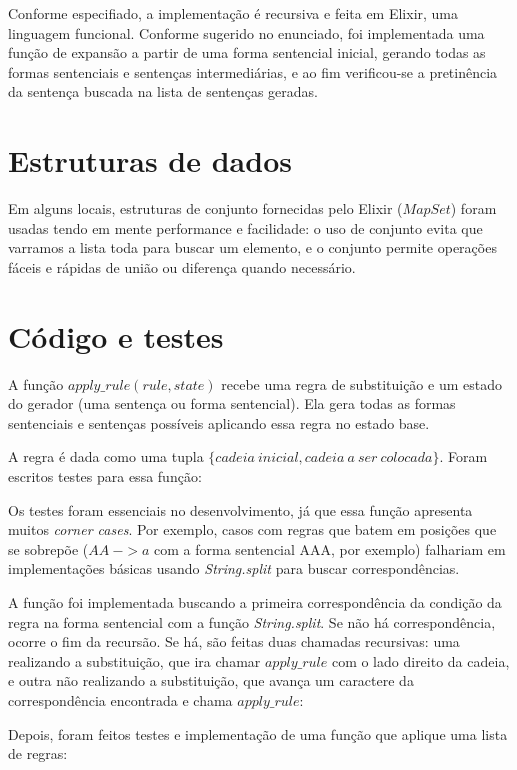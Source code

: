 \documentclass[conference]{IEEEtran}
\begin{document}
Conforme especifiado, a implementação é recursiva e feita em Elixir, uma linguagem funcional. Conforme sugerido no enunciado, foi implementada uma função de expansão a partir de uma forma sentencial inicial, gerando todas as formas sentenciais e sentenças intermediárias, e ao fim verificou-se a pretinência da sentença buscada na lista de sentenças geradas.

\section{Estruturas de dados}

Em alguns locais, estruturas de conjunto fornecidas pelo Elixir ($MapSet$) foram usadas tendo em mente performance e facilidade: o uso de conjunto evita que varramos a lista toda para buscar um elemento, e o conjunto permite operações fáceis e rápidas de união ou diferença quando necessário.

\section{Código e testes}

A função $apply\_rule(rule, state)$ recebe uma regra de substituição e um estado do gerador (uma sentença ou forma sentencial). Ela gera todas as formas sentenciais e sentenças possíveis aplicando essa regra no estado base.

A regra é dada como uma tupla $\{cadeia\ inicial, cadeia\ a\ ser\ colocada\}$. Foram escritos testes para essa função:



Os testes foram essenciais no desenvolvimento, já que essa função apresenta muitos \emph{corner cases}. Por exemplo, casos com regras que batem em posições que se sobrepõe ($AA\ -> a$ com a forma sentencial AAA, por exemplo) falhariam em implementações básicas usando \emph{String.split} para buscar correspondências.

A função foi implementada buscando a primeira correspondência da condição da regra na forma sentencial com a função \emph{String.split}. Se não há correspondência, ocorre o fim da recursão. Se há, são feitas duas chamadas recursivas: uma realizando a substituição, que ira chamar $apply\_rule$ com o lado direito da cadeia, e outra não realizando a substituição, que avança um caractere da correspondência encontrada e chama $apply\_rule$:



Depois, foram feitos testes e implementação de uma função que aplique uma lista de regras:
\end{document}
